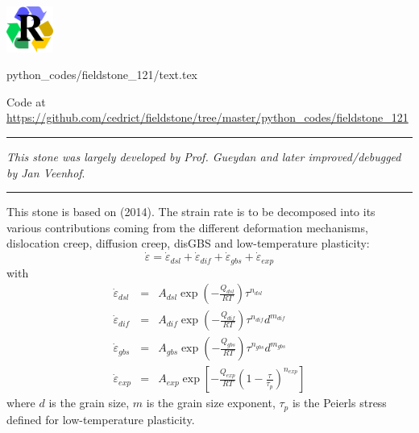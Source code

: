 \includegraphics[height=1.5cm]{images/pictograms/replication}

\begin{flushright} {\tiny {\color{gray} python\_codes/fieldstone\_121/text.tex}} \end{flushright}

\begin{center}

Code at \url{https://github.com/cedrict/fieldstone/tree/master/python_codes/fieldstone_121}
\end{center}

\par\noindent\rule{\textwidth}{0.4pt}

{\sl This stone was largely developed by Prof. Gueydan and later improved/debugged 
by Jan Veenhof}. 

\par\noindent\rule{\textwidth}{0.4pt}

This stone is based on \textcite{gupr14} (2014). 
The strain rate is to be decomposed into its various contributions 
coming from the different deformation mechanisms, dislocation creep,
diffusion creep, disGBS and low-temperature plasticity:
\[
\dot\varepsilon = \dot\varepsilon_{dsl} + \dot\varepsilon_{dif} + 
\dot\varepsilon_{gbs} + \dot\varepsilon_{exp} 
\]
with
\begin{eqnarray}
\dot{\varepsilon}_{dsl}&=&A_{dsl}\exp\left(-\frac{Q_{dsl}}{RT} \right) \tau^{n_{dsl}}  \\
\dot{\varepsilon}_{dif}&=&A_{dif}\exp\left(-\frac{Q_{dif}}{RT} \right) \tau^{n_{dif}} d^{m_{dif}} \\
\dot{\varepsilon}_{gbs}&=&A_{gbs}\exp\left(-\frac{Q_{gbs}}{RT} \right) \tau^{n_{gbs}} d^{m_{gbs}} \\
\dot{\varepsilon}_{exp}&=&A_{exp}\exp\left[-\frac{Q_{exp}}{RT} \left(1 -\frac{\tau}{\tau_p}\right)^{n_{exp}} \right]   
\end{eqnarray}
where $d$ is the grain size, $m$ is the grain size exponent, $\tau_p$ is the Peierls stress defined
for low-temperature plasticity.

